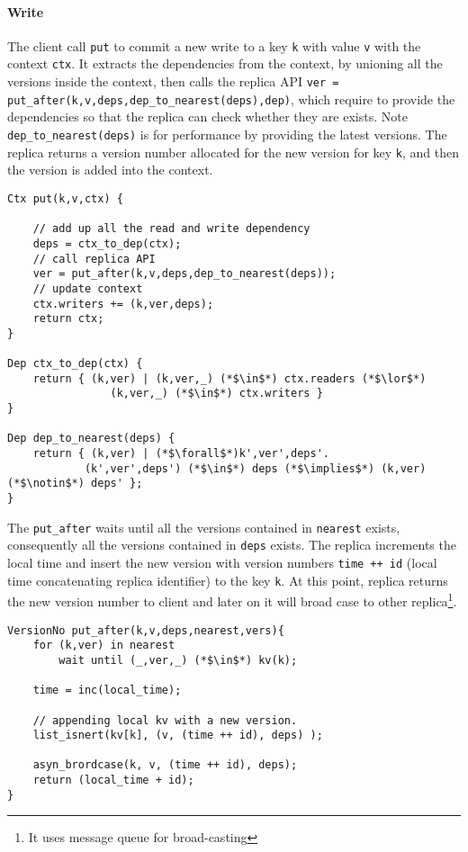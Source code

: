 \paragraph{\bf Write}
The client call \verb|put| to commit a new write to a key \verb|k| with value \verb|v| with the context \verb|ctx|.
It extracts the dependencies from the context, by unioning all the versions inside the context,
then calls the replica API \verb|ver = put_after(k,v,deps,dep_to_nearest(deps),dep)|,
which require to provide the dependencies so that the replica can check whether they are exists.
Note \verb|dep_to_nearest(deps)| is for performance by providing the latest versions.
The replica returns a version number allocated for the new version for key \verb|k|,
and then the version is added into the context.

\begin{lstlisting}[caption={Client API for write},label={lst:cops-client-api-write}]
Ctx put(k,v,ctx) {

    // add up all the read and write dependency
    deps = ctx_to_dep(ctx);
    // call replica API
    ver = put_after(k,v,deps,dep_to_nearest(deps));
    // update context
    ctx.writers += (k,ver,deps);
    return ctx;
}

Dep ctx_to_dep(ctx) {
    return { (k,ver) | (k,ver,_) (*$\in$*) ctx.readers (*$\lor$*)
                (k,ver,_) (*$\in$*) ctx.writers }
}

Dep dep_to_nearest(deps) {
    return { (k,ver) | (*$\forall$*)k',ver',deps'.
            (k',ver',deps') (*$\in$*) deps (*$\implies$*) (k,ver) (*$\notin$*) deps' };
}
\end{lstlisting}

The \verb|put_after| waits until all the versions contained in \verb|nearest| exists,
consequently all the versions contained in \verb|deps| exists.
The replica increments the local time and insert the new version with version numbers \verb|time ++ id| (local time concatenating replica identifier) to the key \verb|k|.
At this point, replica returns the new version number to client and 
later on it will broad case to other replica\footnote{It uses message queue for broad-casting}.

\begin{lstlisting}[caption={Replica API for write},label={lst:cops-replica-api-write}]
VersionNo put_after(k,v,deps,nearest,vers){
    for (k,ver) in nearest
        wait until (_,ver,_) (*$\in$*) kv(k);

    time = inc(local_time);

    // appending local kv with a new version.
    list_isnert(kv[k], (v, (time ++ id), deps) );

    asyn_brordcase(k, v, (time ++ id), deps);
    return (local_time + id);
}
\end{lstlisting}

